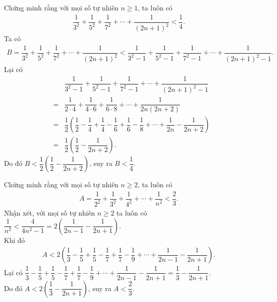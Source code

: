 \begin{bt}%
 Chứng minh rằng với mọi số tự nhiên $n \geq 1$, ta luôn có
 \begin{eqnarray*}
  \dfrac{1}{3^2} + \dfrac{1}{5^2} + \dfrac{1}{7^2} + \cdots + \dfrac{1}{(2n+1)^2} < \dfrac{1}{4}.
 \end{eqnarray*}
 \loigiai
  {
  Ta có
  \begin{eqnarray*}
   B = \dfrac{1}{3^2} + \dfrac{1}{5^2} + \dfrac{1}{7^2} + \cdots + \dfrac{1}{(2n+1)^2} < \dfrac{1}{3^2-1} + \dfrac{1}{5^2-1} + \dfrac{1}{7^2-1} + \cdots + \dfrac{1}{(2n+1)^2-1}.
  \end{eqnarray*}
  Lại có
  \allowdisplaybreaks
  \begin{eqnarray*}
   & & \dfrac{1}{3^2-1} + \dfrac{1}{5^2-1} + \dfrac{1}{7^2-1} + \cdots + \dfrac{1}{(2n+1)^2-1}\\
   &=& \dfrac{1}{2 \cdot 4} + \dfrac{1}{4 \cdot 6} + \dfrac{1}{6 \cdot 8} + \cdots + \dfrac{1}{2n(2n+2)}\\
   &=& \dfrac{1}{2} \left(\dfrac{1}{2}-\dfrac{1}{4} + \dfrac{1}{4}-\dfrac{1}{6} + \dfrac{1}{6}-\dfrac{1}{8} + \cdots + \dfrac{1}{2n}-\dfrac{1}{2n+2}\right)\\
   &=& \dfrac{1}{2} \left(\dfrac{1}{2}-\dfrac{1}{2n+2}\right).
  \end{eqnarray*}
  Do đó $B < \dfrac{1}{2} \left(\dfrac{1}{2}-\dfrac{1}{2n+2}\right)$, suy ra $B<\dfrac{1}{4}$.
  }
\end{bt}

\begin{bt}%
 Chứng minh rằng với mọi số tự nhiên $n \geq 2$, ta luôn có
 \begin{eqnarray*}
  A= \dfrac{1}{2^2} + \dfrac{1}{3^2} + \dfrac{1}{4^2} + \cdots + \dfrac{1}{n^2} < \dfrac{2}{3}.
 \end{eqnarray*}
 \loigiai
  {
  Nhận xét, với mọi số tự nhiên $n \geq 2$ ta luôn có $\dfrac{1}{n^2} < \dfrac{4}{4n^2-1} = 2\left(\dfrac{1}{2n-1}-\dfrac{1}{2n+1}\right)$.\\
  Khi đó
  \allowdisplaybreaks
  \begin{eqnarray*}
   A < 2\left(\dfrac{1}{3}-\dfrac{1}{5} + \dfrac{1}{5}-\dfrac{1}{7} + \dfrac{1}{7}-\dfrac{1}{9} + \cdots + \dfrac{1}{2n-1}-\dfrac{1}{2n+1}\right).
  \end{eqnarray*}
  Lại có $\dfrac{1}{3}-\dfrac{1}{5} + \dfrac{1}{5}-\dfrac{1}{7} + \dfrac{1}{7}-\dfrac{1}{9} + \cdots + \dfrac{1}{2n-1}-\dfrac{1}{2n+1} = \dfrac{1}{3}-\dfrac{1}{2n+1}$.\\
  Do đó $A < 2\left(\dfrac{1}{3}-\dfrac{1}{2n+1}\right)$, suy ra $A < \dfrac{2}{3}$.
  }
\end{bt}

